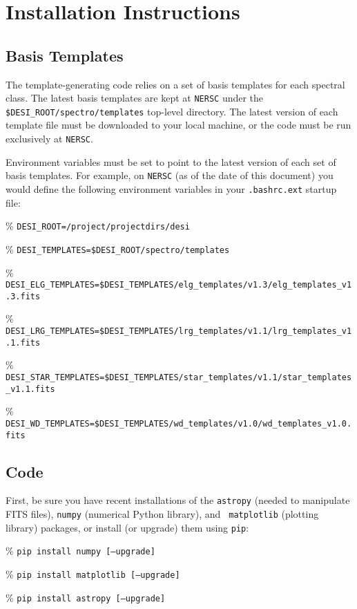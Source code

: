 \documentclass[12pt]{article}
\begin{document}


%


\clearpage
\appendix

\section{Installation Instructions}\label{sec:install}

\subsection{Basis Templates}

The template-generating code relies on a set of basis templates for each
spectral class.  The latest basis templates are kept at {\tt NERSC} under the
{\tt \$DESI\_ROOT/spectro/templates} top-level directory.  The latest version of
each template file must be downloaded to your local machine, or the code must be
run exclusively at {\tt NERSC}.

Environment variables must be set to point to the latest version of each set of
basis templates.  For example, on {\tt NERSC} (as of the date of this document)
you would define the following environment variables in your {\tt .bashrc.ext}
startup file:
\begin{itemize*}
  \item[\%]{{\tt DESI\_ROOT=/project/projectdirs/desi}}
  \item[\%]{{\tt DESI\_TEMPLATES=\$DESI\_ROOT/spectro/templates}}
  \item[\%]{{\tt DESI\_ELG\_TEMPLATES=\$DESI\_TEMPLATES/elg\_templates/v1.3/elg\_templates\_v1.3.fits}}
  \item[\%]{{\tt DESI\_LRG\_TEMPLATES=\$DESI\_TEMPLATES/lrg\_templates/v1.1/lrg\_templates\_v1.1.fits}}
  \item[\%]{{\tt DESI\_STAR\_TEMPLATES=\$DESI\_TEMPLATES/star\_templates/v1.1/star\_templates\_v1.1.fits}}
  \item[\%]{{\tt DESI\_WD\_TEMPLATES=\$DESI\_TEMPLATES/wd\_templates/v1.0/wd\_templates\_v1.0.fits}}
\end{itemize*}

\subsection{Code}

First, be sure you have recent installations of the {\tt astropy} (needed to
manipulate FITS files), {\tt numpy} (numerical Python library), and {\tt
  matplotlib} (plotting library) packages, or install (or upgrade) them using
{\tt pip}:
\begin{itemize*}
  \item[\%]{{\tt pip install numpy [--upgrade]}}
  \item[\%]{{\tt pip install matplotlib [--upgrade]}}
  \item[\%]{{\tt pip install astropy [--upgrade]}}
\end{itemize*}
\end{document}
